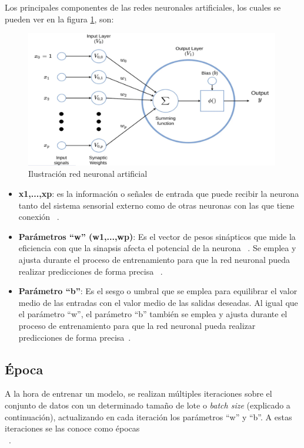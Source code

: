 Los principales componentes de las redes neuronales artificiales, los cuales se pueden ver en la figura \ref{fig:w_b}, son:

\begin{figure}[h]
    \centering
    \includegraphics[width=0.99\textwidth]{img/w_b.PNG}
    \caption{Ilustración red neuronal artificial  ~\cite{montesinos2022fundamentals}}
    \label{fig:w_b}
\end{figure}
\FloatBarrier

\begin{itemize}
    \item \textbf{x1,...,xp}: es la información o señales de entrada que puede recibir la neurona tanto del sistema sensorial externo como de otras neuronas con las que tiene conexión ~\cite{montesinos2022fundamentals}.
    \item \textbf{Parámetros ``w'' (w1,...,wp)}: Es el vector de pesos sinápticos que mide la eficiencia con que la sinapsis afecta el potencial de la neurona ~\cite{montesinos2022fundamentals}. Se emplea y ajusta durante el proceso de entrenamiento para que la red neuronal pueda realizar predicciones de forma precisa ~\cite{diego23}. 
    \item \textbf{Parámetro ``b''}: Es el sesgo o umbral que se emplea para equilibrar el valor medio de las entradas con el valor medio de las salidas deseadas. Al igual que el parámetro ``w'', el parámetro ``b'' también se emplea y ajusta durante el proceso de entrenamiento para que la red neuronal pueda realizar predicciones de forma precisa~\cite{diego23}. 
\end{itemize}


\subsection{Época}
A la hora de entrenar un modelo, se realizan múltiples iteraciones sobre el conjunto de datos con un determinado tamaño de lote o \textit{batch size} (explicado a continuación), actualizando en cada iteración los parámetros ``w'' y ``b''. A estas iteraciones se las conoce como épocas\\ ~\cite{diego23}.

